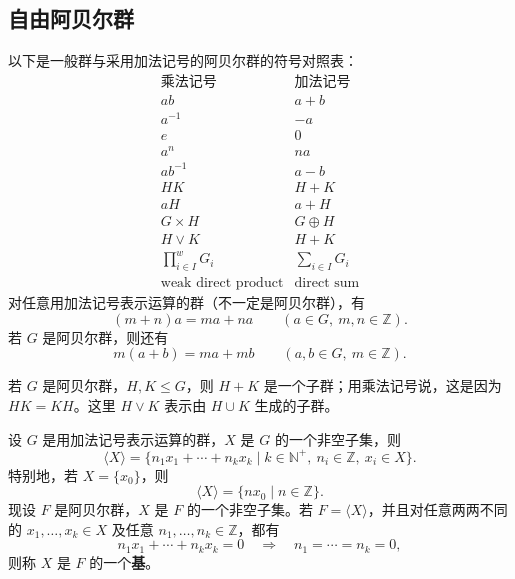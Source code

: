 \subsection{自由阿贝尔群}


\begin{proposition}[乘法记号与加法记号的对照]\label{prop:abelian-additive-notation}
以下是一般群与采用加法记号的阿贝尔群的符号对照表：
\[
  \begin{array}{c|c}
    \text{乘法记号} & \text{加法记号} \\ \hline
    ab & a+b \\
    a^{-1} & -a \\
    e & 0 \\
    a^n & na \\
    ab^{-1} & a-b \\
    HK & H+K \\
    aH & a+H \\
    G\times H & G\oplus H \\
    H\vee K & H+K \\
    \prod\nolimits_{i\in I}^{w}G_i & \sum_{i\in I}G_i \\
    \text{weak direct product} & \text{direct sum}
  \end{array}
\]
对任意用加法记号表示运算的群（不一定是阿贝尔群），有
\[
  (m+n)a=ma+na\qquad(a\in G,\ m,n\in\mathbb Z).
\]
若 $G$ 是阿贝尔群，则还有
\[
  m(a+b)=ma+mb\qquad(a,b\in G,\ m\in\mathbb Z).
\]
\end{proposition}

\begin{purplenote}
若 $G$ 是阿贝尔群，$H,K\leq G$，则 $H+K$ 是一个子群；用乘法记号说，这是因为 $HK=KH$。这里 $H\vee K$ 表示由 $H\cup K$ 生成的子群。
\end{purplenote}

\begin{definition}[阿贝尔群的基]\label{def:abelian-group-basis}
设 $G$ 是用加法记号表示运算的群，$X$ 是 $G$ 的一个非空子集，则
\[
  \langle X\rangle
  =\{n_1x_1+\cdots+n_kx_k\mid
      k\in\mathbb N^+,\ n_i\in\mathbb Z,\ x_i\in X\}.
\]
特别地，若 $X=\{x_0\}$，则
\[
  \langle X\rangle=\{nx_0\mid n\in\mathbb Z\}.
\]
现设 $F$ 是阿贝尔群，$X$ 是 $F$ 的一个非空子集。若 $F=\langle X\rangle$，并且对任意两两不同的 $x_1,\ldots,x_k\in X$ 及任意 $n_1,\ldots,n_k\in\mathbb Z$，都有
\[
  n_1x_1+\cdots+n_kx_k=0
  \quad\Longrightarrow\quad n_1=\cdots=n_k=0,
\]
则称 $X$ 是 $F$ 的一个\textbf{基}。
\end{definition}

